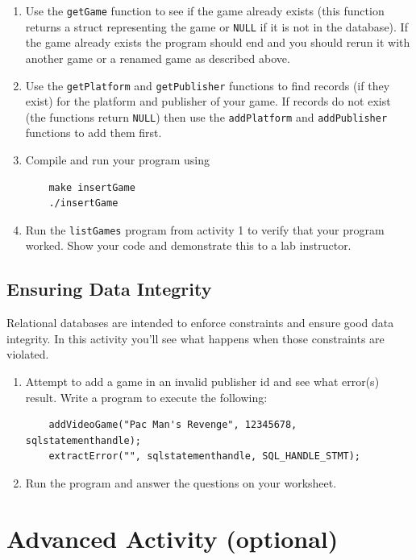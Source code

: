 \documentclass[12pt]{scrartcl}
\begin{document}
\begin{enumerate}
  \item Use the \texttt{getGame} function to see if the game 
	already exists (this function returns a struct representing the game 
	or \texttt{NULL} if it is not in the database).  If the game 
	already exists the program should end and you should rerun it with 
	another game or a renamed game as described above.
  \item Use the \texttt{getPlatform} and \texttt{getPublisher} 
	functions to find records (if they exist) for the platform and publisher 
	of your game.  If records do not exist (the functions return 
	\texttt{NULL}) then use the \texttt{addPlatform} and 
	\texttt{addPublisher} functions to add them first.
  \item Compile and run your program using
	
	\begin{verbatim}
	make insertGame
	./insertGame
	\end{verbatim}
  \item Run the \texttt{listGames} program from activity 1 
  	to verify that your program worked.  Show your code and demonstrate 
	this to a lab instructor.
\end{enumerate}

\subsection{Ensuring Data Integrity}

Relational databases are intended to enforce constraints and ensure 
good data integrity.  In this activity you'll see what happens when those
constraints are violated.

\begin{enumerate}
  \item Attempt to add a game in an invalid publisher id and see what 
  	error(s) result.  Write a program to execute the following:
	
	\begin{verbatim}
	addVideoGame("Pac Man's Revenge", 12345678, sqlstatementhandle);
	extractError("", sqlstatementhandle, SQL_HANDLE_STMT);
	\end{verbatim}
  \item Run the program and answer the questions on your worksheet.
\end{enumerate}

\section{Advanced Activity (optional)}
\end{document}
